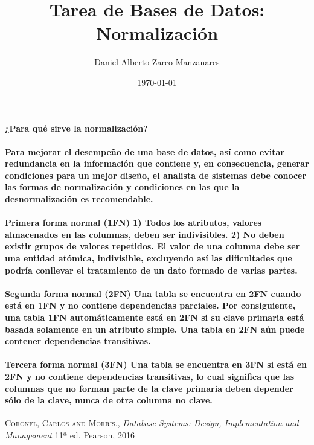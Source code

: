 \documentclass{article}
\begin{document}
\title{Tarea de Bases de Datos: Normalización}
\author{Daniel Alberto Zarco Manzanares}
\date{\today}
\maketitle

\paragraph{¿Para qué sirve la normalización?}
\paragraph{
Para mejorar el desempeño de una base de datos, así como evitar redundancia en la información que contiene y, en consecuencia, generar condiciones para un mejor diseño, el analista de sistemas debe conocer las formas de normalización y condiciones en las que la desnormalización es recomendable.
}
\paragraph{
Primera forma normal (1FN)
1) Todos los atributos, valores almacenados en las columnas, deben ser indivisibles.
2) No deben existir grupos de valores repetidos.
El valor de una columna debe ser una entidad atómica, indivisible, excluyendo así las dificultades que podría conllevar el tratamiento de un dato formado de varias partes.
}
\paragraph{
Segunda forma normal (2FN)
Una tabla se encuentra en 2FN cuando está en 1FN y no contiene dependencias parciales. Por consiguiente, una tabla 1FN automáticamente está en 2FN si su clave primaria está basada solamente en un atributo simple. Una tabla en 2FN aún puede contener dependencias transitivas.
}
\paragraph{
Tercera forma normal (3FN)
Una tabla se encuentra en 3FN si está en 2FN y no contiene dependencias transitivas, lo cual significa que las columnas que no forman parte de la clave primaria deben depender sólo de la clave, nunca de otra columna no clave.
}
\begin{thebibliography}{a}
 \textsc{Coronel, Carlos and Morris.},
\textit{Database Systems: Design, Implementation and Management}
11ª ed. Pearson,  2016  
\end{thebibliography}
\end{document}
